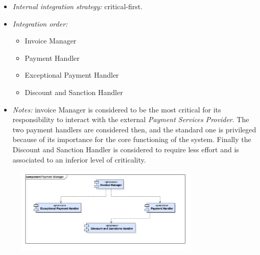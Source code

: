 			\begin{itemize}[label={},leftmargin=*,noitemsep,topsep=0pt]
				\item \textit{Internal integration strategy:} critical-first.
				\item \textit{Integration order:}
					\begin{itemize}[noitemsep]
						\item Invoice Manager
						\item Payment Handler
						\item Exceptional Payment Handler
						\item Discount and Sanction Handler
					\end{itemize}
				\item \textit{Notes: } invoice Manager is considered to be the most critical for its responsibility to interact with the external \textit{Payment Services Provider}. The two payment handlers are considered then, and the standard one is privileged because of its importance for the core functioning of the system. Finally the Discount and Sanction Handler is considered to require less effort and is associated to an inferior level of criticality.
			\end{itemize}
			\begin{figure}[h]
				\includegraphics[width=250pt, center]{img/integration_strategy/subcomponents/payment_manager.png}
			\end{figure}
		\FloatBarrier

